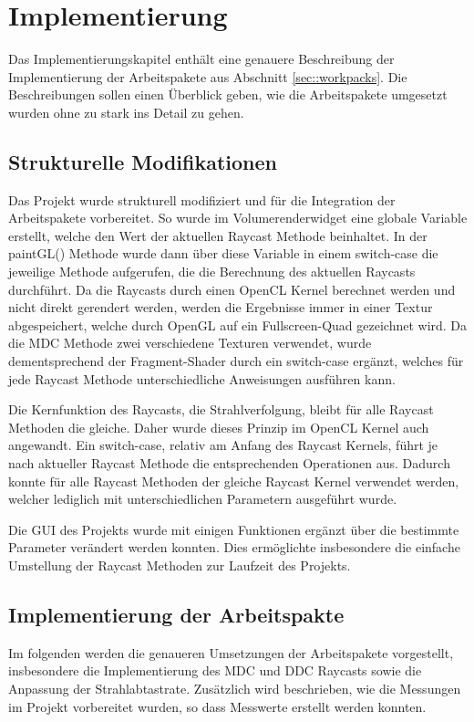 \chapter{Implementierung}\label{chap::impl}
Das Implementierungskapitel enthält eine genauere Beschreibung der Implementierung der Arbeitspakete aus Abschnitt \ref{sec::workpacks}.
Die Beschreibungen sollen einen Überblick geben, wie die Arbeitspakete umgesetzt wurden ohne zu stark ins Detail zu gehen.

\section{Strukturelle Modifikationen}\label{sec::sm}
Das Projekt wurde strukturell modifiziert und für die Integration der Arbeitspakete vorbereitet.
So wurde im Volumerenderwidget eine globale Variable erstellt, welche den Wert der aktuellen Raycast Methode beinhaltet.
In der paintGL() Methode wurde dann über diese Variable in einem switch-case die jeweilige Methode aufgerufen, die die Berechnung des aktuellen Raycasts durchführt.
Da die Raycasts durch einen OpenCL Kernel berechnet werden und nicht direkt gerendert werden, werden die Ergebnisse immer in einer Textur abgespeichert, welche durch OpenGL auf ein Fullscreen-Quad gezeichnet wird.
Da die MDC Methode zwei verschiedene Texturen verwendet, wurde dementsprechend der Fragment-Shader durch ein switch-case ergänzt, welches für jede Raycast Methode unterschiedliche Anweisungen ausführen kann.

Die Kernfunktion des Raycasts, die Strahlverfolgung, bleibt für alle Raycast Methoden die gleiche.
Daher wurde dieses Prinzip im OpenCL Kernel auch angewandt.
Ein switch-case, relativ am Anfang des Raycast Kernels, führt je nach aktueller Raycast Methode die entsprechenden Operationen aus.
Dadurch konnte für alle Raycast Methoden der gleiche Raycast Kernel verwendet werden, welcher lediglich mit unterschiedlichen Parametern ausgeführt wurde.

Die GUI des Projekts wurde mit einigen Funktionen ergänzt über die bestimmte Parameter verändert werden konnten.
Dies ermöglichte insbesondere die einfache Umstellung der Raycast Methoden zur Laufzeit des Projekts.

\section{Implementierung der Arbeitspakte}\label{sec::ida}
Im folgenden werden die genaueren Umsetzungen der Arbeitspakete vorgestellt, insbesondere die Implementierung des MDC und DDC Raycasts sowie die Anpassung der Strahlabtastrate.
Zusätzlich wird beschrieben, wie die Messungen im Projekt vorbereitet wurden, so dass Messwerte erstellt werden konnten.

